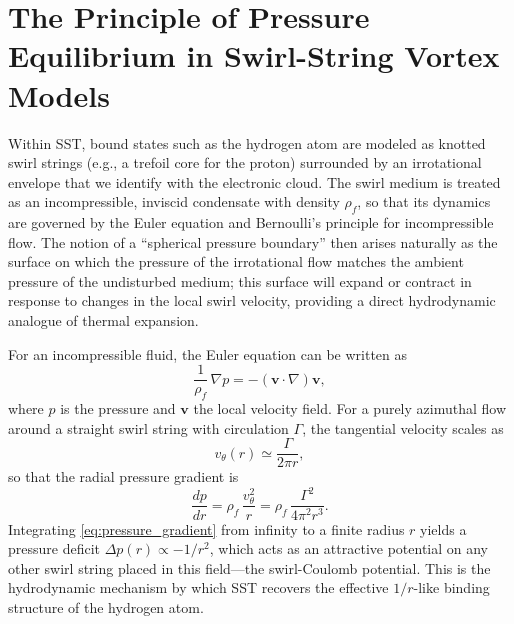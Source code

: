 \documentclass[10pt,reprint,aps,onecolumn,nofootinbib]{revtex4-2}
\newcommand{\rhof}{\rho_{\!f}}                           %
\begin{document}
    \section{The Principle of Pressure Equilibrium in Swirl-String Vortex Models}

        Within SST, bound states such as the hydrogen atom are modeled as knotted swirl strings (e.g., a trefoil core for the proton) surrounded by an irrotational envelope that we identify with the electronic cloud. The swirl medium is treated as an incompressible, inviscid condensate with density \(\rhof\), so that its dynamics are governed by the Euler equation and Bernoulli's principle for incompressible flow.\cite{Batchelor1967,IskandaraniHydrogenGS} The notion of a ``spherical pressure boundary'' then arises naturally as the surface on which the pressure of the irrotational flow matches the ambient pressure of the undisturbed medium; this surface will expand or contract in response to changes in the local swirl velocity, providing a direct hydrodynamic analogue of thermal expansion.

        For an incompressible fluid, the Euler equation can be written as
        \begin{equation}
            \frac{1}{\rhof}\,\nabla p = -(\mathbf{v}\cdot\nabla)\mathbf{v},
            \label{eq:Euler}
        \end{equation}
        where \(p\) is the pressure and \(\mathbf{v}\) the local velocity field.\cite{Batchelor1967} For a purely azimuthal flow around a straight swirl string with circulation \(\Gamma\), the tangential velocity scales as
        \begin{equation}
            v_\theta(r) \simeq \frac{\Gamma}{2\pi r},
        \end{equation}
        so that the radial pressure gradient is
        \begin{equation}
            \frac{dp}{dr}
            =
            \rhof\,\frac{v_\theta^2}{r}
            =
            \rhof\,\frac{\Gamma^2}{4\pi^2 r^3}.
            \label{eq:pressure_gradient}
        \end{equation}
        Integrating \eqref{eq:pressure_gradient} from infinity to a finite radius \(r\) yields a pressure deficit \(\Delta p(r)\propto -1/r^2\), which acts as an attractive potential on any other swirl string placed in this field---the swirl-Coulomb potential.\cite{IskandaraniHydrogenGS} This is the hydrodynamic mechanism by which SST recovers the effective \(1/r\)-like binding structure of the hydrogen atom.
\end{document}
